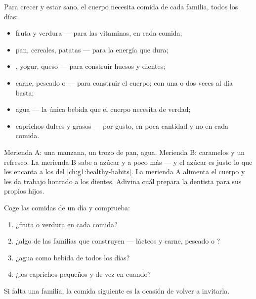 \begin{proposition}\label{prop:g2:teeth-and-eating-well:balanced}
Para crecer y estar sano, el cuerpo necesita comida de cada familia,
todos los días:
\begin{itemize}
  \item fruta y verdura --- para las vitaminas, en cada comida;
  \item pan, cereales, patatas --- para la energía que dura;
  \item {}, yogur, queso --- para construir huesos y dientes;
  \item carne, pescado o  --- para construir el cuerpo; con una
        o dos veces al día basta;
  \item agua --- la única bebida que el cuerpo necesita de verdad;
  \item caprichos dulces y grasos --- por gusto, en poca cantidad y no
        en cada comida.
\end{itemize}
\end{proposition}
\admitted

\begin{example}\label{ex:g2:teeth-and-eating-well:snack}
Merienda A: una manzana, un trozo de pan, agua. Merienda B: caramelos
y un refresco. La merienda B sabe a azúcar y a poco más --- y el
azúcar es justo lo que les encanta a los  del
\cref{ch:g1:healthy-habits}. La merienda A alimenta el cuerpo y les da
trabajo honrado a los dientes. Adivina cuál prepara la dentista para
sus propios hijos.
\end{example}

\begin{method}\label{met:g2:teeth-and-eating-well:check}
Coge las comidas de un día y comprueba:
\begin{enumerate}
  \item ¿fruta o verdura en cada comida?
  \item ¿algo de las familias que construyen --- lácteos y carne,
        pescado o ?
  \item ¿agua como bebida de todos los días?
  \item ¿los caprichos pequeños y de vez en cuando?
\end{enumerate}
Si falta una familia, la comida siguiente es la ocasión de volver a
invitarla.
\end{method}

